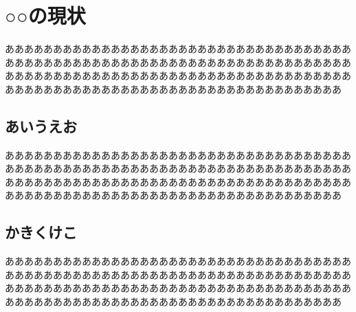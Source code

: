 \chapter{○○の現状}
あああああああああああああああああああああああああああああああああああああああああああああああああああああああああああああああああああああああああああああああああああああああああああああああああああああああああああああああああああああああああああああああああああああああああああああああ

\section{あいうえお}
あああああああああああああああああああああああああああああああああああああああああああああああああああああああああああああああああああああああああああああああああああああああああああああああああああああああああああああああああああああああああああああああああああああああああああああああ


\section{かきくけこ}
あああああああああああああああああああああああああああああああああああああああああああああああああああああああああああああああああああああああああああああああああああああああああああああああああああああああああああああああああああああああああああああああああああああああああああああああ


